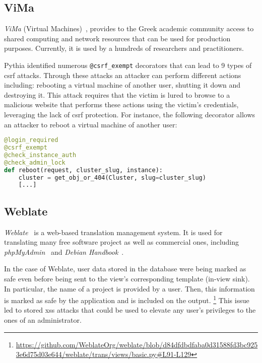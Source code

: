 \vspace{-1mm}

\subsection{ViMa}
\label{sec:vima}

{\it ViMa} (Virtual Machines)~\cite{vima},
provides to the Greek academic community
access to shared computing and network resources that can be used
for production purposes.
Currently,
it is used by a hundreds of researchers
and practitioners.

Pythia identified numerous
{\tt @csrf\_exempt} decorators
that can lead to 9 types of
{\sc csrf} attacks.
Through these attacks an attacker
can perform different actions including:
rebooting a virtual machine of another user,
shutting it down and destroying it. This attack
requires that the victim is lured to browse to a malicious
website that performs these actions using the
victim's credentials, leveraging the lack of
{\sc csrf} protection.
For instance,
the following decorator
allows an attacker to reboot
a virtual machine of another user:

\vspace{0.8mm}
\begin{lstlisting}[language=Python, basicstyle=\footnotesize\ttfamily]
@login_required
@csrf_exempt
@check_instance_auth
@check_admin_lock
def reboot(request, cluster_slug, instance):
    cluster = get_obj_or_404(Cluster, slug=cluster_slug)
    [...]
\end{lstlisting}
\vspace{-2mm}

\subsection{Weblate}
\label{sec:weblate}
\begin{comment}
https://github.com/WeblateOrg/weblate/blob/d84dfdbdfaba0d31588fd3bc9253e6d75d03e644/weblate/trans/views/basic.py#L91-L129
\end{comment}
{\it Weblate}~\cite{weblate} is a web-based
translation management system.
It is  used for translating many free
software project as well as commercial ones,
including
{\it phpMyAdmin}~\cite{phpma} and
{\it Debian Handbook}~\cite{dhbk}.

In the case of Weblate,
user data stored in the database
were being marked as safe
even before being sent to the view's corresponding template (in-view sink).
In particular,
the name of a project is provided by a user.
Then,
this information is marked as safe by
the application and is included on
the output. {\footnote{\url{https://github.com/WeblateOrg/weblate/blob/d84dfdbdfaba0d31588fd3bc9253e6d75d03e644/weblate/trans/views/basic.py\#L91-L129}}}
This issue led to stored {\sc xss} attacks
that could be used to elevate any user's privileges to the ones of an administrator.

